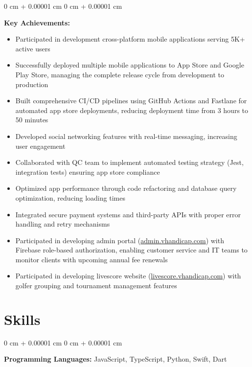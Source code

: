 \documentclass[10pt, letterpaper]{article}
\newenvironment{highlights}{
    \begin{itemize}[
        topsep=0.10 cm,
        parsep=0.10 cm,
        partopsep=0pt,
        itemsep=0pt,
        leftmargin=0 cm + 10pt
    ]
}{
    \end{itemize}
} %
\newenvironment{onecolentry}{
    \begin{adjustwidth}{
        0 cm + 0.00001 cm
    }{
        0 cm + 0.00001 cm
    }
}{
    \end{adjustwidth}
} %
\begin{document}
        \vspace{0.15 cm}
        \begin{onecolentry}
            \textbf{Key Achievements:}
            \begin{highlights}
                \item Participated in development cross-platform mobile applications serving 5K+ active users
                \item Successfully deployed multiple mobile applications to App Store and Google Play Store, managing the complete release cycle from development to production
                \item Built comprehensive CI/CD pipelines using GitHub Actions and Fastlane for automated app store deployments, reducing deployment time from 3 hours to 50 minutes
                \item Developed social networking features with real-time messaging, increasing user engagement
                \item Collaborated with QC team to implement automated testing strategy (Jest, integration tests) ensuring app store compliance
                \item Optimized app performance through code refactoring and database query optimization, reducing loading times
                \item Integrated secure payment systems and third-party APIs with proper error handling and retry mechanisms
                \item Participated in developing admin portal (\href{https://admin.vhandicap.com}{admin.vhandicap.com}) with Firebase role-based authorization, enabling customer service and IT teams to monitor clients with upcoming annual fee renewals
                \item Participated in developing livescore website (\href{https://livescore.vhandicap.com}{livescore.vhandicap.com}) with golfer grouping and tournament management features
            \end{highlights}
        \end{onecolentry}

    \section{Skills}

        \begin{onecolentry}
            \textbf{Programming Languages:} JavaScript, TypeScript, Python, Swift, Dart
        \end{onecolentry}
\end{document}

